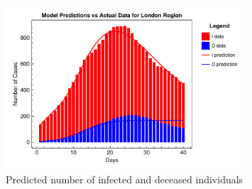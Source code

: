 \documentclass[12pt]{article}
\begin{document}
\begin{figure}[ht]
    \centering
    \includegraphics[width=0.8\textwidth]{images/ude/London Region_infected_death_data.pdf}
    \caption{Predicted number of infected and deceased individuals}
    \label{fig:ude_London}
\end{figure}
\end{document}
